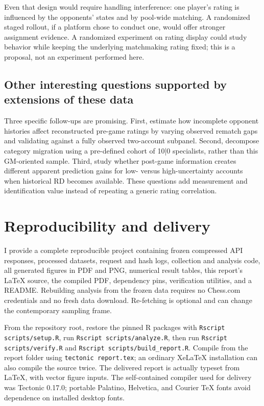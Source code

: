 \documentclass[11pt,a4paper]{article}
\begin{document}
Even that design would require handling interference: one player's rating is influenced by the opponents' states and by pool-wide matching. A randomized staged rollout, if a platform chose to conduct one, would offer stronger assignment evidence. A randomized experiment on rating display could study behavior while keeping the underlying matchmaking rating fixed; this is a proposal, not an experiment performed here.

\subsection{Other interesting questions supported by extensions of these data}

Three specific follow-ups are promising. First, estimate how incomplete opponent histories affect reconstructed pre-game ratings by varying observed rematch gaps and validating against a fully observed two-account subpanel. Second, decompose category migration using a pre-defined cohort of 10|0 specialists, rather than this GM-oriented sample. Third, study whether post-game information creates different apparent prediction gains for low- versus high-uncertainty accounts when historical RD becomes available. These questions add measurement and identification value instead of repeating a generic rating correlation.

\section{Reproducibility and delivery}

I provide a complete reproducible project containing frozen compressed API responses, processed datasets, request and hash logs, collection and analysis code, all generated figures in PDF and PNG, numerical result tables, this report's LaTeX source, the compiled PDF, dependency pins, verification utilities, and a README. Rebuilding analysis from the frozen data requires no Chess.com credentials and no fresh data download. Re-fetching is optional and can change the contemporary sampling frame.

From the repository root, restore the pinned R packages with \texttt{Rscript scripts/setup.R}, run \texttt{Rscript scripts/analyze.R}, then run \texttt{Rscript scripts/verify.R} and \texttt{Rscript scripts/build\_report.R}. Compile from the report folder using \texttt{tectonic report.tex}; an ordinary XeLaTeX installation can also compile the source twice. The delivered report is actually typeset from LaTeX, with vector figure inputs. The self-contained compiler used for delivery was Tectonic 0.17.0; portable Palatino, Helvetica, and Courier TeX fonts avoid dependence on installed desktop fonts.
\end{document}
